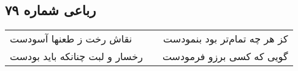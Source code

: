 \begin{center}
\section*{رباعی شماره ۷۹}
\label{sec:sh079}
\begin{longtable}{l p{0.5cm} r}
نقاش رخت ز طعنها آسودست
&&
کز هر چه تمام‌تر بود بنمودست
\\
رخسار و لبت چنانکه باید بودست
&&
گویی که کسی برزو فرمودست
\\
\end{longtable}
\end{center}
